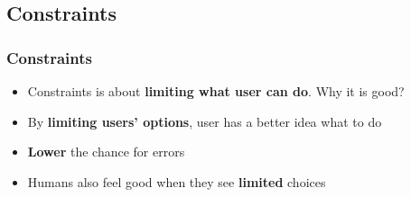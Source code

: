 \documentclass{beamer}
\begin{document}
\subsection{Constraints}
\begin{frame}
\frametitle{Constraints}
\begin{itemize}
	\item Constraints is about \textbf{limiting what user can do}.  Why it is good?
	\item By \textbf{limiting users' options}, user has a better idea what to do
	\item \textbf{Lower} the chance for errors
	\item Humans also feel good when they see \textbf{limited }choices
\end{itemize}
\end{frame}


\end{document}
